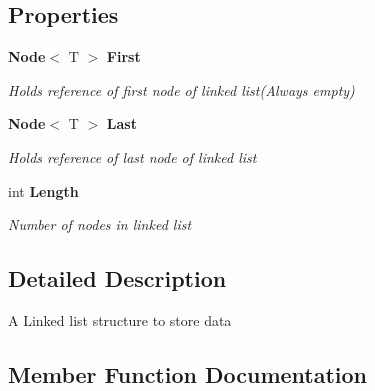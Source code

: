 \subsection*{Properties}
\begin{DoxyCompactItemize}
\item 
\mbox{\label{class_d_s_project_universal_1_1_util_1_1_linked_list_adfe5f05fe4391ae50513ecf8da3ec145}} 
\textbf{ Node}$<$ T $>$ \textbf{ First}\hspace{0.3cm}{\ttfamily  [get]}
\begin{DoxyCompactList}\small\item\em Holds reference of first node of linked list(\+Always empty)\end{DoxyCompactList}\item 
\mbox{\label{class_d_s_project_universal_1_1_util_1_1_linked_list_add6980ca0ec7f282cd28c7cc29b1978d}} 
\textbf{ Node}$<$ T $>$ \textbf{ Last}\hspace{0.3cm}{\ttfamily  [get]}
\begin{DoxyCompactList}\small\item\em Holds reference of last node of linked list\end{DoxyCompactList}\item 
\mbox{\label{class_d_s_project_universal_1_1_util_1_1_linked_list_a3f7ef2fea107d1018397b020609d3aa8}} 
int \textbf{ Length}\hspace{0.3cm}{\ttfamily  [get]}
\begin{DoxyCompactList}\small\item\em Number of nodes in linked list\end{DoxyCompactList}\end{DoxyCompactItemize}


\subsection{Detailed Description}
A Linked list structure to store data

\subsection{Member Function Documentation}
\mbox{\label{class_d_s_project_universal_1_1_util_1_1_linked_list_a3c9e82c09dce1c4b8f38743350514185}} 
